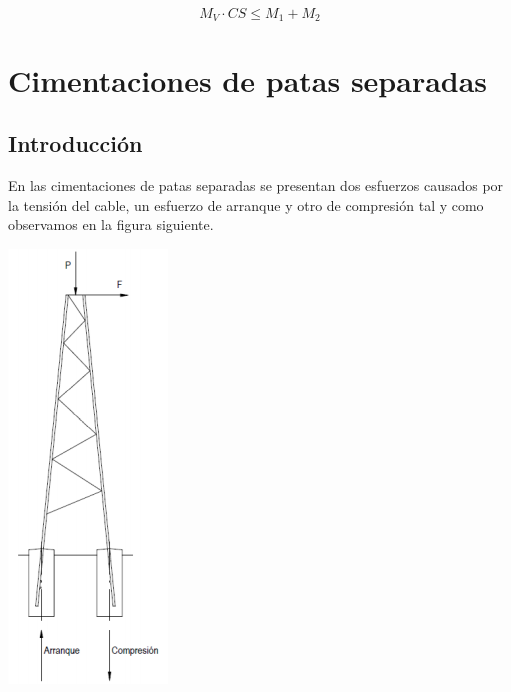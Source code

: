 \documentclass{article}
\begin{document}
$$ M_{V} \cdot C S \leq M_{1}+M_{2}$$
\newpage
\section{Cimentaciones de patas separadas}
    \subsection{Introducción}
        En las cimentaciones de patas separadas se presentan dos esfuerzos causados por la tensión del cable, un esfuerzo de arranque y otro de compresión tal y como observamos en la figura siguiente.
        \begin{center}
            \includegraphics[scale=1.3]{assets/img/Patas Separadas/Cimentacion de patas separadas.png}
        \end{center}
        
    \newpage
\end{document}
